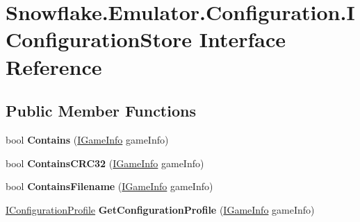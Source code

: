 \hypertarget{interface_snowflake_1_1_emulator_1_1_configuration_1_1_i_configuration_store}{}\section{Snowflake.\+Emulator.\+Configuration.\+I\+Configuration\+Store Interface Reference}
\label{interface_snowflake_1_1_emulator_1_1_configuration_1_1_i_configuration_store}
\subsection*{Public Member Functions}
\begin{DoxyCompactItemize}
\item 
\hypertarget{interface_snowflake_1_1_emulator_1_1_configuration_1_1_i_configuration_store_a9bea5639d3384a2100bcaa2af7192cd0}{}bool {\bfseries Contains} (\hyperlink{interface_snowflake_1_1_game_1_1_i_game_info}{I\+Game\+Info} game\+Info)\label{interface_snowflake_1_1_emulator_1_1_configuration_1_1_i_configuration_store_a9bea5639d3384a2100bcaa2af7192cd0}

\item 
\hypertarget{interface_snowflake_1_1_emulator_1_1_configuration_1_1_i_configuration_store_a61eee34e631353bc79f2264b11630abd}{}bool {\bfseries Contains\+C\+R\+C32} (\hyperlink{interface_snowflake_1_1_game_1_1_i_game_info}{I\+Game\+Info} game\+Info)\label{interface_snowflake_1_1_emulator_1_1_configuration_1_1_i_configuration_store_a61eee34e631353bc79f2264b11630abd}

\item 
\hypertarget{interface_snowflake_1_1_emulator_1_1_configuration_1_1_i_configuration_store_a7e5cb85edda5aa8e06356c883590503f}{}bool {\bfseries Contains\+Filename} (\hyperlink{interface_snowflake_1_1_game_1_1_i_game_info}{I\+Game\+Info} game\+Info)\label{interface_snowflake_1_1_emulator_1_1_configuration_1_1_i_configuration_store_a7e5cb85edda5aa8e06356c883590503f}

\item 
\hypertarget{interface_snowflake_1_1_emulator_1_1_configuration_1_1_i_configuration_store_a94468436279c0d7c41f38a8f70464b3e}{}\hyperlink{interface_snowflake_1_1_emulator_1_1_configuration_1_1_i_configuration_profile}{I\+Configuration\+Profile} {\bfseries Get\+Configuration\+Profile} (\hyperlink{interface_snowflake_1_1_game_1_1_i_game_info}{I\+Game\+Info} game\+Info)\label{interface_snowflake_1_1_emulator_1_1_configuration_1_1_i_configuration_store_a94468436279c0d7c41f38a8f70464b3e}

\end{DoxyCompactItemize}

